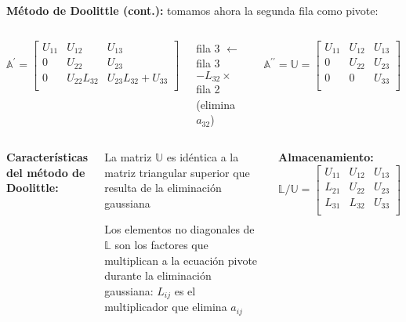 \documentclass[9pt, aspectratio=169]{beamer}
\begin{document}
\begin{frame}
 \textbf{Método de Doolittle (cont.):} tomamos ahora la segunda fila como pivote:
\begin{columns}
\cx
\begin{equation*}
 \mathbb{A}^{\prime}= \left[ \begin{array}{ccc}
 U_{11} & U_{12} & U_{13} \\
 0 & U_{22} & U_{23} \\
 0 & U_{22}L_{32} & U_{23} L_{32} + U_{33} \\
 \end{array} \right]
\end{equation*}

\cx
 \begin{center}
  fila 3 $\leftarrow$ fila 3 $- L_{32} \times$ fila 2 (elimina $a_{32}$)
 \end{center}
 \begin{equation*}
\mathbb{A}^{\prime \prime} = \mathbb{U} = \left[ 
 \begin{array}{ccc}
 U_{11} & U_{12} & U_{13} \\
 0 & U_{22} & U_{23} \\
 0 & 0 & U_{33} \\
 \end{array} \right]
  \end{equation*}
\end{columns}
 \bigskip \pause
 \begin{columns}[t]
\textbf{Características del método de Doolittle:} \medskip
 
 \begin{itemize} {\small
  \item La matriz $\mathbb{U}$ es idéntica a la matriz triangular superior que resulta de la eliminación gaussiana
  \medskip
  
  \item Los elementos no diagonales de $\mathbb{L}$ son los factores que multiplican a la ecuación pivote durante la eliminación gaussiana: $L_{ij}$ es el multiplicador que elimina $a_{ij}$ }
 \end{itemize} \pause
{}
\textbf{Almacenamiento:} \bigskip
 \begin{equation*}
\mathbb{L}/\mathbb{U} = \left[ 
 \begin{array}{ccc}
 U_{11} & U_{12} & U_{13} \\
 L_{21} & U_{22} & U_{23} \\
 L_{31} & L_{32} & U_{33} \\
 \end{array} \right]
  \end{equation*}
 \end{columns}
\end{frame}
\end{document}
